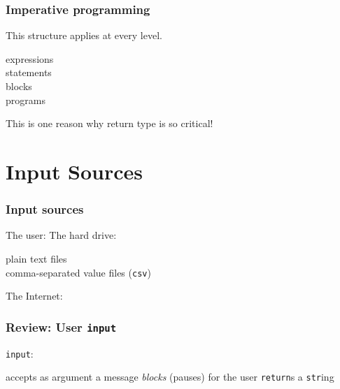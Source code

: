 \documentclass[11pt]{beamer}
\begin{document}
\begin{frame}[fragile]
  \frametitle{Imperative programming}
  \Enlarge

  \begin{itemize}
  \myitem  This structure applies at every level.
    \begin{itemize}
    \mysubitem  expressions \\
    \mysubitem  statements \\
    \mysubitem  blocks \\
    \mysubitem  programs
    \end{itemize} %
  \myitem  This is one reason why return type is so critical!
  \end{itemize}
\end{frame}

\section{Input Sources}

\begin{frame}[fragile]
  \frametitle{Input sources}
  \Enlarge

  \begin{itemize}
  \myitem  The user:  %
  \myitem  The hard drive:  %
    \begin{itemize}
    \mysubitem  plain text files \\
    \mysubitem  comma-separated value files (\texttt{csv}) \\
    \end{itemize} %
  \myitem  The Internet:  %
  \end{itemize}
\end{frame}


\begin{frame}[fragile]
  \frametitle{Review:  User \texttt{input}}
  \Enlarge

  \begin{itemize}
  \myitem  \texttt{input}:
    \begin{itemize}
    \mysubitem  accepts as argument a message
    \mysubitem  \emph{blocks} (pauses) for the user
    \mysubitem  \texttt{return}s a \texttt{str}ing
    \end{itemize}
  \end{itemize}
\end{frame}
\end{document}
